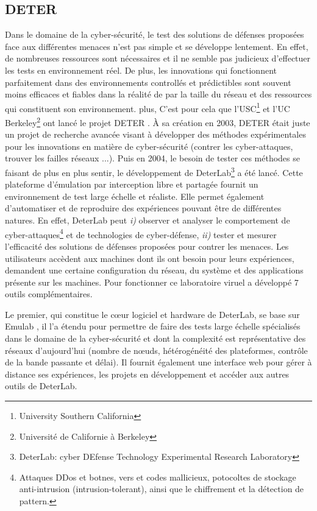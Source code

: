 \subsection{DETER}

Dans le domaine de la cyber-sécurité, le test des solutions de
défenses proposées face aux différentes menaces n'est pas simple et se
développe lentement. En effet, de nombreuses ressources sont
nécessaires et il ne semble pas judicieux d'effectuer les tests en
environnement réel. De plus, les innovations qui fonctionnent
parfaitement dans des environnements controllés et prédictibles sont
souvent moins efficaces et fiables dans la réalité de par la taille du
réseau et des ressources qui constituent son environnement. %
plus,
C'est pour cela que l'USC\footnote{University Southern California} et
l'UC Berkeley\footnote{Université de Californie à Berkeley} ont lancé
le projet DETER \citep{DETER_Project, DETER_benzel2011science,
  DETER_mirkovic2010deter}. À sa création en 2003, DETER était juste
un projet de recherche avancée visant à développer des méthodes
expérimentales pour les innovations en matière de cyber-sécurité
(contrer les cyber-attaques, trouver les failles réseaux ...). Puis en
2004, le besoin de tester ces méthodes se faisant de plus en plus
sentir, le développement de DeterLab\footnote{DeterLab: cyber DEfense
  Technology Experimental Research Laboratory} a été lancé. Cette
plateforme d'émulation par interception libre et partagée fournit
un environnement de test large échelle et réaliste. Elle permet
également d'automatiser et de reproduire des expériences pouvant être
de différentes natures. En effet, DeterLab peut \textit{i)} observer
et analyser le comportement de cyber-attaques\footnote{ Attaques DDos
  et botnes, vers et codes mallicieux, potocoltes de stockage
  anti-intrusion (intrusion-tolerant), ainsi que le chiffrement et la
  détection de pattern.} et de technologies de cyber-défense,
\textit{ii)} tester et mesurer l'efficacité des solutions de défenses
proposées pour contrer les menaces. Les utilisateurs accèdent aux
machines dont ils ont besoin  pour leurs expériences, demandent une
certaine configuration du réseau, du système et des applications
présente sur les machines. Pour fonctionner ce laboratoire viruel a
développé 7 outils complémentaires.

Le premier, qui constitue le c\oe ur logiciel et hardware de DeterLab,
se base sur Emulab \citep{EMULAB_INIT}, il l'a étendu pour permettre
de faire des tests large échelle spécialisés dans le domaine de la
cyber-sécurité et dont la complexité est représentative des réseaux
d'aujourd'hui (nombre de n\oe uds, hétérogénéité des plateformes,
contrôle de la bande passante et délai). Il fournit également une
interface web pour gérer à distance ses expériences, les projets en
développement et accéder aux autres outils de DeterLab.

